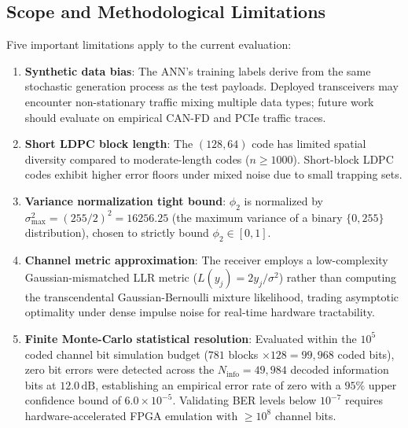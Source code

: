 \documentclass[conference]{IEEEtran}
\begin{document}
\subsection{Scope and Methodological Limitations}
Five important limitations apply to the current evaluation:
\begin{enumerate}
    \item \textbf{Synthetic data bias}: The ANN's training labels derive from the same stochastic generation process as the test payloads. Deployed transceivers may encounter non-stationary traffic mixing multiple data types; future work should evaluate on empirical CAN-FD and PCIe traffic traces.
    \item \textbf{Short LDPC block length}: The $(128, 64)$ code has limited spatial diversity compared to moderate-length codes ($n \ge 1000$). Short-block LDPC codes exhibit higher error floors under mixed noise due to small trapping sets.
    \item \textbf{Variance normalization tight bound}: $\phi_2$ is normalized by $\sigma^2_{\max} = (255/2)^2 = 16256.25$ (the maximum variance of a binary $\{0, 255\}$ distribution), chosen to strictly bound $\phi_2 \in [0, 1]$.
    \item \textbf{Channel metric approximation}: The receiver employs a low-complexity Gaussian-mismatched LLR metric ($L(y_j) = 2y_j/\sigma^2$) rather than computing the transcendental Gaussian-Bernoulli mixture likelihood, trading asymptotic optimality under dense impulse noise for real-time hardware tractability.
    \item \textbf{Finite Monte-Carlo statistical resolution}: Evaluated within the $10^5$ coded channel bit simulation budget ($781$ blocks $\times 128 = 99{,}968$ coded bits), zero bit errors were detected across the $N_{\text{info}} = 49{,}984$ decoded information bits at $12.0\,\text{dB}$, establishing an empirical error rate of zero with a $95\%$ upper confidence bound of $6.0 \times 10^{-5}$. Validating BER levels below $10^{-7}$ requires hardware-accelerated FPGA emulation with $\ge 10^8$ channel bits.
\end{enumerate}

\end{document}
